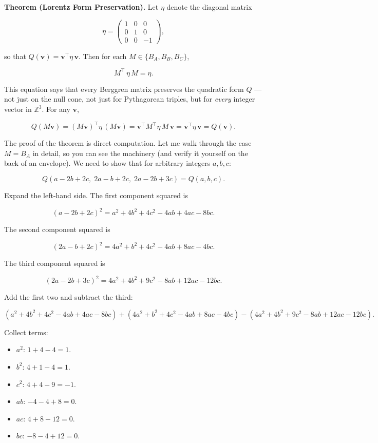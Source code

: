 \documentclass[11pt,openany]{book}
\theoremstyle{definition}
\theoremstyle{plain}
\theoremstyle{remark}
\begin{document}
\textbf{Theorem (Lorentz Form Preservation).} Let $\eta$ denote the diagonal matrix

$$\eta = \begin{pmatrix} 1 & 0 & 0 \\ 0 & 1 & 0 \\ 0 & 0 & -1 \end{pmatrix},$$

so that $Q(\mathbf{v}) = \mathbf{v}^\top \eta\, \mathbf{v}$. Then for each $M \in \{B_A, B_B, B_C\}$,

$$M^{\!\top}\, \eta\, M = \eta.$$

This equation says that every Berggren matrix preserves the quadratic form $Q$ — not just on the null cone, not just for Pythagorean triples, but for \textit{every} integer vector in $\mathbb{Z}^3$. For any $\mathbf{v}$,

$$Q(M\mathbf{v}) = (M\mathbf{v})^\top \eta\, (M\mathbf{v}) = \mathbf{v}^\top M^\top \eta\, M\, \mathbf{v} = \mathbf{v}^\top \eta\, \mathbf{v} = Q(\mathbf{v}).$$

The proof of the theorem is direct computation. Let me walk through the case $M = B_A$ in detail, so you can see the machinery (and verify it yourself on the back of an envelope). We need to show that for arbitrary integers $a, b, c$:

$$Q(a - 2b + 2c,\; 2a - b + 2c,\; 2a - 2b + 3c) = Q(a, b, c).$$

Expand the left-hand side. The first component squared is

$$(a - 2b + 2c)^2 = a^2 + 4b^2 + 4c^2 - 4ab + 4ac - 8bc.$$

The second component squared is

$$(2a - b + 2c)^2 = 4a^2 + b^2 + 4c^2 - 4ab + 8ac - 4bc.$$

The third component squared is

$$(2a - 2b + 3c)^2 = 4a^2 + 4b^2 + 9c^2 - 8ab + 12ac - 12bc.$$

Add the first two and subtract the third:

$$(a^2 + 4b^2 + 4c^2 - 4ab + 4ac - 8bc) + (4a^2 + b^2 + 4c^2 - 4ab + 8ac - 4bc) - (4a^2 + 4b^2 + 9c^2 - 8ab + 12ac - 12bc).$$

Collect terms:
\begin{itemize}
\item $a^2$: $1 + 4 - 4 = 1$.
\item $b^2$: $4 + 1 - 4 = 1$.
\item $c^2$: $4 + 4 - 9 = -1$.
\item $ab$: $-4 - 4 + 8 = 0$.
\item $ac$: $4 + 8 - 12 = 0$.
\item $bc$: $-8 - 4 + 12 = 0$.
\end{itemize}
\end{document}
